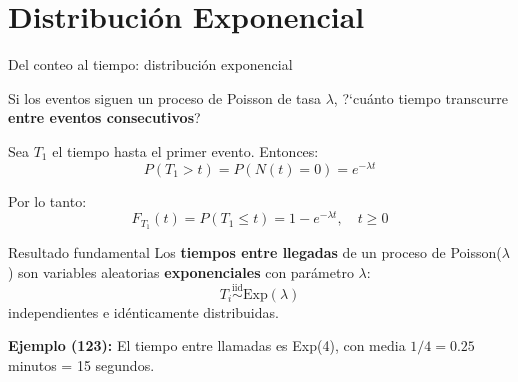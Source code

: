 \documentclass[aspectratio=1610, 9pt]{beamer}
\begin{document}
\section{Distribuci\'{o}n Exponencial}

\begin{frame}{Del conteo al tiempo: distribuci\'{o}n exponencial}

Si los eventos siguen un proceso de Poisson de tasa $\lambda$, ?`cu\'{a}nto tiempo transcurre \textbf{entre eventos consecutivos}?

\vspace{0.3cm}
Sea $T_1$ el tiempo hasta el primer evento. Entonces:
\[
P(T_1 > t) = P(N(t) = 0) = e^{-\lambda t}
\]

Por lo tanto:
\[
F_{T_1}(t) = P(T_1 \leq t) = 1 - e^{-\lambda t}, \quad t \geq 0
\]

\begin{block}{Resultado fundamental}
Los \textbf{tiempos entre llegadas} de un proceso de Poisson($\lambda$) son variables aleatorias \textbf{exponenciales} con par\'{a}metro $\lambda$:
\[
T_i \overset{\text{iid}}{\sim} \text{Exp}(\lambda)
\]
independientes e id\'{e}nticamente distribuidas.
\end{block}

\textbf{Ejemplo (123):} El tiempo entre llamadas es Exp(4), con media $1/4 = 0.25$ minutos = 15 segundos.
\end{frame}
\end{document}
